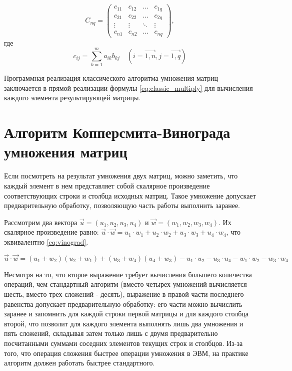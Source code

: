 \documentclass[12pt]{report}
\begin{document}
    \begin{equation}
        C_{nq} = \begin{pmatrix}
                     c_{11} & c_{12} & \ldots & c_{1q} \\
                     c_{21} & c_{22} & \ldots & c_{2q} \\
                     \vdots & \vdots & \ddots & \vdots \\
                     c_{n1} & c_{n2} & \ldots & c_{nq}
        \end{pmatrix},
    \end{equation}
    где
    \begin{equation}
        \label{eq:classic_multiply}
        c_{ij} = \sum_{k=1}^{m}a_{ik}b_{kj}\quad(i=\vec{1, n}, j=\vec{1,q})
    \end{equation}

    Программная реализация классического алгоритма умножения матриц заключается
    в прямой реализации формулы \ref{eq:classic_multiply} для вычисления каждого элемента
    результирующей матрицы.


    \section{Алгоритм Копперсмита-Винограда умножения матриц}

    Если посмотреть на результат умножения двух матриц, можно заметить, что каждый элемент в нем
    представляет собой скалярное произведение соответствующих строки и столбца исходных матриц.
    Такое умножение допускает предварительную обработку, позволяющую часть работы выполнить заранее.

    Рассмотрим два вектора $\vec{u} = (u_1, u_2, u_3, u_4)$ и $\vec{w} = (w_1, w_2, w_3, w_4)$.
    Их скалярное произведение равно: $\vec{u} \cdot \vec{w} = u_1 \cdot w_1 + u_2 \cdot w_2 + u_3 \cdot w_3 +
    u_4 \cdot w_4$, что эквивалентно \ref{eq:vinograd}.

    \begin{equation}
        \label{eq:vinograd}
        \vec{u} \cdot \vec{w} = (u_1 + w_2)(u_2 + w_1) + (u_3 + w_4)(u_4 + w_3)
        - u_1 \cdot u_2 - u_3 \cdot u_4 - w_1 \cdot w_2 - w_3 \cdot w_4
    \end{equation}

    Несмотря на то, что второе выражение требует вычисления большего количества операций,
    чем стандартный алгоритм (вместо четырех умножений вычисляется шесть, вместо трех сложений - десять),
    выражение в правой части последнего равенства допускает предварительную обработку:
    его части можно вычислить заранее и запомнить для каждой строки первой матрицы
    и для каждого столбца второй, что позволит для каждого элемента выполнять лишь два умножения
    и пять сложений, складывая затем только лишь с двумя предварительно
    посчитанными суммами соседних элементов текущих строк и столбцов.
    Из-за того, что операция сложения быстрее операции умножения в ЭВМ,
    на практике алгоритм должен работать быстрее стандартного.
\end{document}
